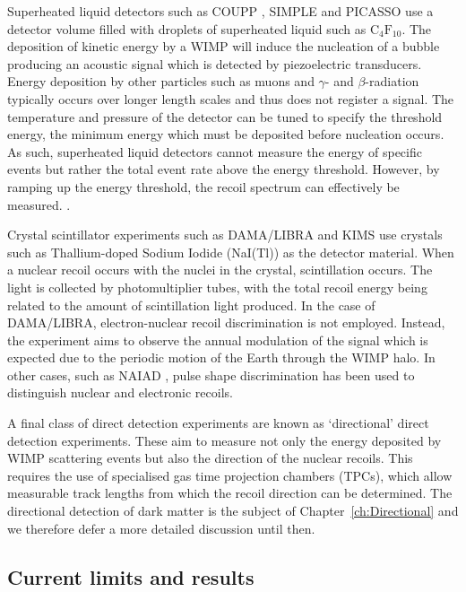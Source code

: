 Superheated liquid detectors such as COUPP \cite{Behnke:2011}, SIMPLE \cite{Felizardo:2012} and PICASSO \cite{Archambault:2012} use a detector volume filled with droplets of superheated liquid such as $\textrm{C}_4\textrm{F}_{10}$. The deposition of kinetic energy by a WIMP will induce the nucleation of a bubble producing an acoustic signal which is detected by piezoelectric transducers. Energy deposition by other particles such as muons and $\gamma$- and $\beta$-radiation typically occurs over longer length scales and thus does not register a signal. The temperature and pressure of the detector can be tuned to specify the threshold energy, the minimum energy which must be deposited before nucleation occurs. As such, superheated liquid detectors cannot measure the energy of specific events but rather the total event rate above the energy threshold. However, by ramping up the energy threshold, the recoil spectrum can effectively be measured. .

Crystal scintillator experiments \cite{Kim:2010} such as DAMA/LIBRA \cite{Bernabei:2008a,Bernabei:2010,Bernabei:2013} and KIMS \cite{Lee:2007} use crystals such as Thallium-doped Sodium Iodide (NaI(Tl)) as the detector material. When a nuclear recoil occurs with the nuclei in the crystal, scintillation occurs. The light is collected by photomultiplier tubes, with the total recoil energy being related to the amount of scintillation light produced. In the case of DAMA/LIBRA, electron-nuclear recoil discrimination is not employed. Instead, the experiment aims to observe the annual modulation of the signal which is expected due to the periodic motion of the Earth through the WIMP halo. In other cases, such as NAIAD \cite{Ahmed:2003}, pulse shape discrimination has been used to distinguish nuclear and electronic recoils.

A final class of direct detection experiments are known as `directional' direct detection experiments. These aim to measure not only the energy deposited by WIMP scattering events but also the direction of the nuclear recoils.  This requires the use of specialised gas time projection chambers (TPCs), which allow measurable track lengths from which the recoil direction can be determined.  The directional detection of dark matter is the subject of Chapter~\ref{ch:Directional} and we therefore defer a more detailed discussion until then.


\subsection{Current limits and results}

